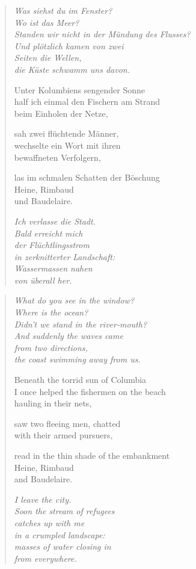 \clearpage

\begin{verse}

{\itshape
Was siehst du im Fenster?\\
Wo ist das Meer?\\
Standen wir nicht in der Mündung des Flusses?\\
Und plötzlich kamen von zwei\\
Seiten die Wellen,\\
die Küste schwamm uns davon.}

Unter Kolumbiens sengender Sonne\\
half ich einmal den Fischern am Strand\\
beim Einholen der Netze,

sah zwei flüchtende Männer,\\
wechselte ein Wort mit ihren\\
bewaffneten Verfolgern,

las im schmalen Schatten der Böschung\\
Heine, Rimbaud\\
und Baudelaire.

{\itshape
Ich verlasse die Stadt.\\
Bald erreicht mich\\
der Flüchtlingsstrom\\
in zerknitterter Landschaft:\\
Wassermassen nahen\\
von überall her.}
\end{verse}

\clearpage

\begin{verse}
{\itshape
What do you see in the window?\\
Where is the ocean?\\
Didn't we stand in the river-mouth?\\
And suddenly the waves came\\
from two directions,\\
the coast swimming away from us.}

Beneath the torrid sun of Columbia\\
I once helped the fishermen on the beach\\
hauling in their nets,

saw two fleeing men, chatted\\
with their armed pursuers,

read in the thin shade of the embankment\\
Heine, Rimbaud\\
and Baudelaire.

{\itshape
I leave the city.\\
Soon the stream of refugees\\
catches up with me\\
in a crumpled landscape:\\
masses of water closing in\\
from everywhere.}
\end{verse}

